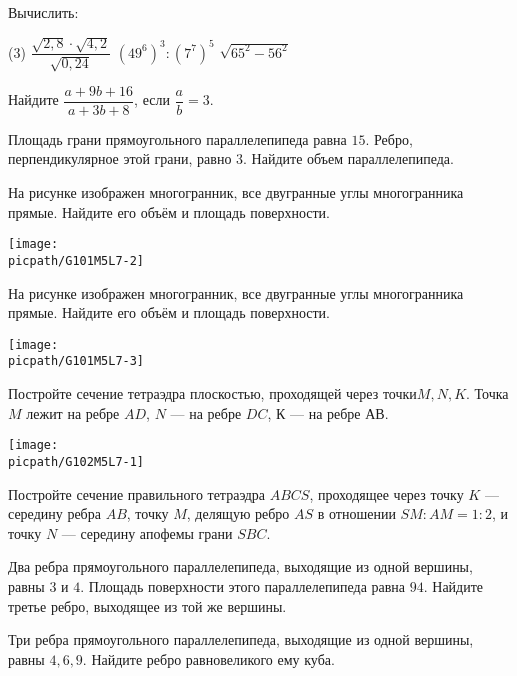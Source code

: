 \begin{exam}
	\begin{listofex}
		\item Вычислить:
		\begin{tasks}(3)
			\task \( \dfrac{\sqrt{2,8}\cdot\sqrt{4,2}}{\sqrt{0,24}} \)
			\task \( (49^6)^3 : (7^7)^5 \)
			\task \( \sqrt{65^2-56^2} \)
		\end{tasks}
		\item Найдите \(\dfrac{a+9b+16}{a+3b+8}\), если \(\dfrac{a}{b}=3\).
		\item Площадь грани прямоугольного параллелепипеда равна \( 15 \). Ребро, перпендикулярное этой грани, равно \(3\). Найдите объем параллелепипеда.
		\item 
		\begin{minipage}[t]{\bodywidth}
			На рисунке изображен многогранник, все двугранные углы многогранника прямые. Найдите его объём и площадь поверхности.
		\end{minipage}
		\hspace{0.02\linewidth}
		\begin{minipage}[t]{\picwidth}
			\texttt{[image: \\picpath/G101M5L7-2]}
		\end{minipage}
		\item 
		\begin{minipage}[t]{\bodywidth}
			На рисунке изображен многогранник, все двугранные углы многогранника прямые. Найдите его объём и площадь поверхности.
		\end{minipage}
		\hspace{0.02\linewidth}
		\begin{minipage}[t]{\picwidth}
			\texttt{[image: \\picpath/G101M5L7-3]}
		\end{minipage}
		\item
		\begin{minipage}[t]{\bodywidth}
			Постройте сечение тетраэдра плоскостью, проходящей через точки\( M, N, K\). Точка \(M\) лежит на ребре \(AD\), \(N\) --- на ребре \(DC\), \(К\) --- на ребре АВ.
		\end{minipage}
		\begin{minipage}[t]{\picwidth}
			\texttt{[image: \\picpath/G102M5L7-1]}
		\end{minipage}
		\item Постройте сечение правильного тетраэдра \(ABCS\), проходящее через точку \(K\) --- середину ребра \(AB\), точку \(M\), делящую ребро \(AS\) в отношении \(SM:AM = 1:2\), и точку \(N\) --- середину апофемы грани \(SBC\).
		\item Два ребра прямоугольного параллелепипеда, выходящие из одной вершины, равны \(3\) и \(4\). Площадь поверхности этого параллелепипеда равна \(94\). Найдите третье ребро, выходящее из той же вершины.
		\item Три ребра прямоугольного параллелепипеда, выходящие из одной вершины, равны \(4, 6, 9\). Найдите ребро равновеликого ему куба.
	\end{listofex}
\end{exam}

